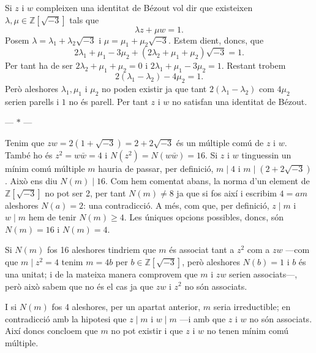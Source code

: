 \documentclass[12pt]{article}
\newcommand{\Z}{\mathbb{Z}}
\newcommand{\R}{\Z[\sqrt{-3}]}
\newcommand{\parbreak}{
	\begin{center}
		--- $\ast$ ---
	\end{center} 
}
\begin{document}
Si \( z \) i \( w \) compleixen una identitat de Bézout vol dir que existeixen \( \lambda, \mu \in \R \) tals que 
\begin{equation*}
	\lambda z + \mu w = 1.
\end{equation*}
Posem \( \lambda = \lambda_1 + \lambda_2\sqrt{-3} \) i \( \mu = \mu_1 + \mu_2 \sqrt{-3} \). Estem dient, doncs, que 
\begin{equation*}
	2\lambda_1 + \mu_1 -3\mu_2 + (2 \lambda_2 + \mu_1 + \mu_2)\sqrt{-3} = 1.
\end{equation*}
Per tant ha de ser \( 2\lambda_2 + \mu_1 + \mu_2 = 0 \) i \( 2\lambda_1 + \mu_1 - 3\mu_2 = 1 \). Restant trobem
\begin{equation*}
	2(\lambda_1 - \lambda_2) - 4\mu_2 = 1. 
\end{equation*}
Però aleshores \( \lambda_1, \mu_1 \) i \( \mu_2  \) no poden existir ja que tant \( 2(\lambda_1 - \lambda_2) \) com \( 4\mu_2 \) serien parells i \( 1 \) no és parell. Per tant \( z \) i \( w \) no satisfan una identitat de Bézout.  

\parbreak

Tenim que \( zw = 2(1 + \sqrt{-3}) = 2 + 2 \sqrt{-3} \) és un múltiple comú de \( z \) i \( w \). També ho és \( z^2 = w \bar{w} = 4 \) i \( N(z^2) = N(w \bar{w}) = 16 \). Si \( z \) i \( w \) tinguessin un mínim comú múltiple \( m \) hauria de passar, per definició, \( m \mid 4 \) i \( m \mid (2 + 2\sqrt{-3}) \). Això ens diu \( N(m) \mid 16 \). Com hem comentat abans, la norma d'un element de \( \R \) no pot ser 2, per tant \( N(m) \neq 8 \) ja que si fos així i escribim \( 4 = am \) aleshores \( N(a) = 2 \): una contradicció. A més, com que, per definició, \( z \mid m \) i \( w \mid m \) hem de tenir \( N(m) \geq 4 \). Les úniques opcions possibles, doncs, són \( N(m) = 16 \) i \( N(m) = 4 \).

Si \( N(m) \) fos 16 aleshores tindriem que \( m \) és associat tant a \( z^2 \) com a \( zw \) ---com que \( m \mid z^2 = 4 \) tenim \( m = 4b \) per \( b \in \R \), però aleshores \( N(b) = 1 \) i \( b \) és una unitat; i de la mateixa manera comprovem que \( m \) i \( zw \) serien associats---, però això sabem que no és el cas ja que \( zw \) i \( z^2 \) no són associats.  

I si \( N(m) \) fos 4 aleshores, per un apartat anterior, \( m \) seria irreductible; en contradicció amb la hipotesi que \( z \mid m \) i \( w \mid m \) ---i amb que \( z \) i \( w \) no són associats. Així doncs concloem que \( m \) no pot existir i que \( z \) i \( w \) no tenen mínim comú múltiple.   
\end{document}
